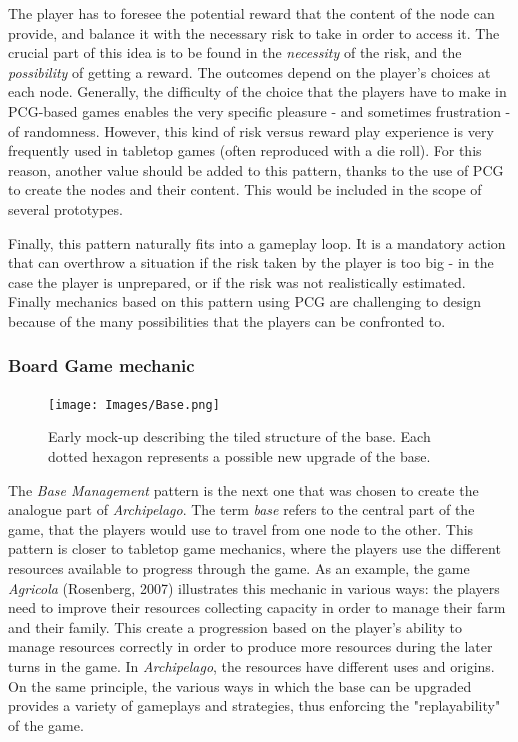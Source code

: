 The player has to foresee the potential reward that the content of the node can provide, and balance it with the necessary risk to take in order to access it. The crucial part of this idea is to be found in the \textit{necessity} of the risk, and the \textit{possibility} of getting a reward. The outcomes depend on the player's choices at each node. Generally, the difficulty of the choice that the players have to make in PCG-based games enables the very specific pleasure - and sometimes frustration - of randomness. However, this kind of risk versus reward play experience is very frequently used in tabletop games (often reproduced with a die roll). For this reason, another value should be added to this pattern, thanks to the use of PCG to create the nodes and their content. This would be included in the scope of several prototypes.

Finally, this pattern naturally fits into a gameplay loop. It is a mandatory action that can overthrow a situation if the risk taken by the player is too big - in the case the player is unprepared, or if the risk was not realistically estimated. Finally mechanics based on this pattern using PCG are challenging to design because of the many possibilities that the players can be confronted to. 
\subsubsection{Board Game mechanic}
\begin{figure}[!ht]
    \centering
    \texttt{[image: Images/Base.png]}
    \caption{Early mock-up describing the tiled structure of the base. Each dotted hexagon represents a possible new upgrade of the base.}
    \label{fig:base}
\end{figure}
The \textit{Base Management} pattern is the next one that was chosen to create the analogue part of \textit{Archipelago}. The term \textit{base} refers to the central part of the game, that the players would use to travel from one node to the other. This pattern is closer to tabletop game mechanics, where the players use the different resources available to progress through the game. As an example, the game \textit{Agricola} (Rosenberg, 2007) \cite{game:agri} illustrates this mechanic in various ways: the players need to improve their resources collecting capacity in order to manage their farm and their family. This create a progression based on the player's ability to manage resources correctly in order to produce more resources during the later turns in the game. In \textit{Archipelago}, the resources have different uses and origins. On the same principle, the various ways in which the base can be upgraded provides a variety of gameplays and strategies, thus enforcing the "replayability" of the game.

